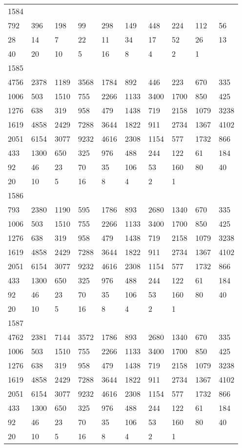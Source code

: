\begin{longtable}{*{10}{l}}
1584&&&&&&&&&\\
792& 396& 198& 99& 298& 149& 448& 224& 112& 56\\
28& 14& 7& 22& 11& 34& 17& 52& 26& 13\\
40& 20& 10& 5& 16& 8& 4& 2& 1& \\

1585&&&&&&&&&\\
4756& 2378& 1189& 3568& 1784& 892& 446& 223& 670& 335\\
1006& 503& 1510& 755& 2266& 1133& 3400& 1700& 850& 425\\
1276& 638& 319& 958& 479& 1438& 719& 2158& 1079& 3238\\
1619& 4858& 2429& 7288& 3644& 1822& 911& 2734& 1367& 4102\\
2051& 6154& 3077& 9232& 4616& 2308& 1154& 577& 1732& 866\\
433& 1300& 650& 325& 976& 488& 244& 122& 61& 184\\
92& 46& 23& 70& 35& 106& 53& 160& 80& 40\\
20& 10& 5& 16& 8& 4& 2& 1& \\

1586&&&&&&&&&\\
793& 2380& 1190& 595& 1786& 893& 2680& 1340& 670& 335\\
1006& 503& 1510& 755& 2266& 1133& 3400& 1700& 850& 425\\
1276& 638& 319& 958& 479& 1438& 719& 2158& 1079& 3238\\
1619& 4858& 2429& 7288& 3644& 1822& 911& 2734& 1367& 4102\\
2051& 6154& 3077& 9232& 4616& 2308& 1154& 577& 1732& 866\\
433& 1300& 650& 325& 976& 488& 244& 122& 61& 184\\
92& 46& 23& 70& 35& 106& 53& 160& 80& 40\\
20& 10& 5& 16& 8& 4& 2& 1& \\

1587&&&&&&&&&\\
4762& 2381& 7144& 3572& 1786& 893& 2680& 1340& 670& 335\\
1006& 503& 1510& 755& 2266& 1133& 3400& 1700& 850& 425\\
1276& 638& 319& 958& 479& 1438& 719& 2158& 1079& 3238\\
1619& 4858& 2429& 7288& 3644& 1822& 911& 2734& 1367& 4102\\
2051& 6154& 3077& 9232& 4616& 2308& 1154& 577& 1732& 866\\
433& 1300& 650& 325& 976& 488& 244& 122& 61& 184\\
92& 46& 23& 70& 35& 106& 53& 160& 80& 40\\
20& 10& 5& 16& 8& 4& 2& 1& \\


\end{longtable}
